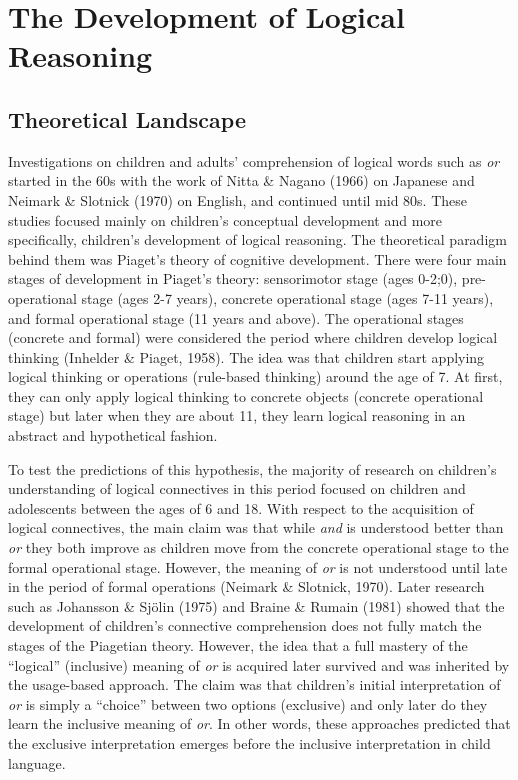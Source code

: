 \documentclass[oneside]{report}
\theoremstyle{definition}
\theoremstyle{definition}
\theoremstyle{definition}
\theoremstyle{remark}
\begin{document}
\section{The Development of Logical
Reasoning}\label{the-development-of-logical-reasoning}

\subsection{Theoretical Landscape}\label{theoretical-landscape}

Investigations on children and adults' comprehension of logical words
such as \emph{or} started in the 60s with the work of Nitta \& Nagano
(1966) on Japanese and Neimark \& Slotnick (1970) on English, and
continued until mid 80s. These studies focused mainly on children's
conceptual development and more specifically, children's development of
logical reasoning. The theoretical paradigm behind them was Piaget's
theory of cognitive development. There were four main stages of
development in Piaget's theory: sensorimotor stage (ages 0-2;0),
pre-operational stage (ages 2-7 years), concrete operational stage (ages
7-11 years), and formal operational stage (11 years and above). The
operational stages (concrete and formal) were considered the period
where children develop logical thinking (Inhelder \& Piaget, 1958). The
idea was that children start applying logical thinking or operations
(rule-based thinking) around the age of 7. At first, they can only apply
logical thinking to concrete objects (concrete operational stage) but
later when they are about 11, they learn logical reasoning in an
abstract and hypothetical fashion.

To test the predictions of this hypothesis, the majority of research on
children's understanding of logical connectives in this period focused
on children and adolescents between the ages of 6 and 18. With respect
to the acquisition of logical connectives, the main claim was that while
\emph{and} is understood better than \emph{or} they both improve as
children move from the concrete operational stage to the formal
operational stage. However, the meaning of \emph{or} is not understood
until late in the period of formal operations (Neimark \& Slotnick,
1970). Later research such as Johansson \& Sjölin (1975) and Braine \&
Rumain (1981) showed that the development of children's connective
comprehension does not fully match the stages of the Piagetian theory.
However, the idea that a full mastery of the ``logical'' (inclusive)
meaning of \emph{or} is acquired later survived and was inherited by the
usage-based approach. The claim was that children's initial
interpretation of \emph{or} is simply a ``choice'' between two options
(exclusive) and only later do they learn the inclusive meaning of
\emph{or}. In other words, these approaches predicted that the exclusive
interpretation emerges before the inclusive interpretation in child
language.
\end{document}
